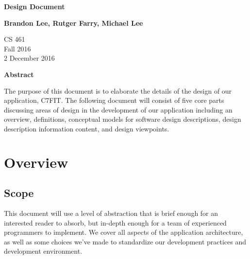 \documentclass[letterpaper,10pt,titlepage]{article}
\begin{document}
\begin{titlepage}
    \begin{center}
        \vspace*{3.5cm}

        \textbf{Design Document}

        \vspace{0.5cm}

        \textbf{Brandon Lee, Rutger Farry, Michael Lee}

        \vspace{0.8cm}

        CS 461\\
        Fall 2016\\
        2 December 2016\\

        \vspace{1cm}

        \textbf{Abstract}\\

        \vspace{0.5cm}

		The purpose of this document is to elaborate the details of the design of our application, C7FIT. The following document will consist of five core parts discussing areas of design in the development of our application including an overview, definitions, conceptual models for software design descriptions, design description information content, and design viewpoints.

        \vfill

    \end{center}
\end{titlepage}

\newpage

\tableofcontents

\newpage

\section{Overview}

\subsection{Scope}
This document will use a level of abstraction that is brief enough for an interested reader to absorb, but in-depth enough for a team of experienced programmers to implement. We cover all aspects of the application architecture, as well as some choices we've made to standardize our development practices and development environment.
\end{document}
